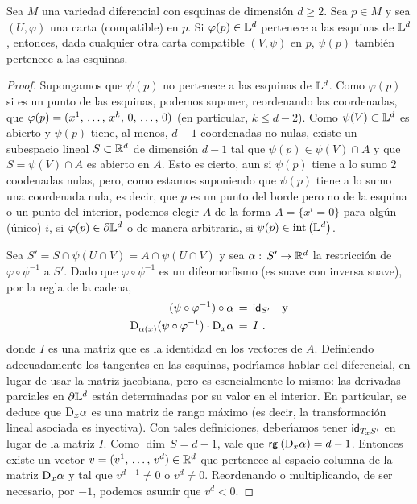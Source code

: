 \begin{teoInvarianzaDeLasEsquinas}\label{thm:invarianzadelasesquinas}
	Sea $M$ una variedad diferencial con esquinas de dimensi\'{o}n
	$d\geq 2$. Sea $p\in M$ y sea $(U,\varphi)$ una carta (compatible)
	en $p$. Si $\varphi(p)\in\esquina{d}$ pertenece a las esquinas de
	$\esquina{d}$, entonces, dada cualquier otra carta compatible
	$(V,\psi)$ en $p$, $\psi(p)$ tambi\'{e}n pertenece a las esquinas.
\end{teoInvarianzaDeLasEsquinas}

\begin{proof}
	Supongamos que $\psi(p)$ no pertenece a las esquinas de $\esquina{d}$.
	Como $\varphi(p)$ si es un punto de las esquinas, podemos suponer,
	reordenando las coordenadas, que $\varphi(p)=%
	(\lista*{x}{k},\,0,\,\dots,\,0)$ (en particular, $k\leq d-2$).
	Como $\psi(V)\subset\esquina{d}$ es abierto y $\psi(p)$ tiene, al
	menos, $d-1$ coordenadas no nulas, existe un subespacio lineal
	$S\subset\bb{R}^{d}$ de dimensi\'{o}n $d-1$ tal que
	$\psi(p)\in\psi(V)\cap A$ y que $S=\psi(V)\cap A$ es abierto en $A$.
	Esto es cierto, aun si $\psi(p)$ tiene a lo sumo $2$ coodenadas nulas,
	pero, como estamos suponiendo que $\psi(p)$ tiene a lo sumo una
	coordenada nula, es decir, que $p$ es un punto del borde pero no de la
	esquina o un punto del interior, podemos elegir $A$ de la forma
	$A=\{x^{i}=0\}$ para alg\'{u}n (\'{u}nico) $i$, si
	$\varphi(p)\in\borde[\esquina{d}]$ o de manera arbitraria,
	si $\psi(p)\in\interior{\esquina{d}}$.
	
	Sea $S'=S\cap\psi(U\cap V)=A\cap\psi(U\cap V)$ y sea
	$\alpha:\,S'\rightarrow\bb{R}^{d}$ la restricci\'{o}n de
	$\varphi\circ\psi^{-1}$ a $S'$. Dado que $\varphi\circ\psi^{-1}$
	es un difeomorfismo (es suave con inversa suave), por la regla de
	la cadena,
	\begin{align*}
		(\psi\circ\varphi^{-1})\circ\alpha & \,=\,\id[S']
			\quad\text{y} \\
		\jacobiana[\alpha(x)]{(\psi\circ\varphi^{-1})}\cdot
			\jacobiana[x]{\alpha} & \,=\,I
		\text{ .}
	\end{align*}
	donde $I$ es una matriz que es la identidad en los vectores de $A$.
	Definiendo adecuadamente los tangentes en las esquinas, podr\'{\i}amos
	hablar del diferencial, en lugar de usar la matriz jacobiana, pero
	es esencialmente lo mismo: las derivadas parciales en
	$\borde[\esquina{d}]$ est\'{a}n determinadas por su valor en el
	interior. En particular, se deduce que $\jacobiana[x]{\alpha}$ es
	una matriz de rango m\'{a}ximo (es decir, la transformaci\'{o}n
	lineal asociada es inyectiva). Con tales definiciones, deber\'{\i}amos
	tener $\id[T_{x}S']$ en lugar de la matriz $I$. Como $\dim\,S=d-1$,
	vale que $\rango{\jacobiana[x]{\alpha}}=d-1$. Entonces existe un
	vector $v=(\lista*{v}{d})\in\bb{R}^{d}$ que pertenece al espacio
	columna de la matriz $\jacobiana[x]{\alpha}$ y tal que
	$v^{d-1}\not =0$ o $v^{d}\not =0$. Reordenando o multiplicando, de
	ser necesario, por $-1$, podemos asumir que $v^{d}<0$.


\end{proof}
